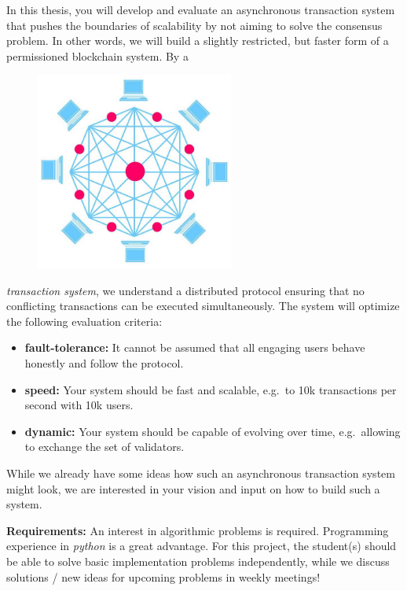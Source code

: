 \documentclass[a4paper,11pt]{article}
\begin{document}
\noindent In this thesis, you will develop and evaluate an asynchronous transaction system that pushes the boundaries of scalability by not aiming to solve the consensus problem. In other words, we will build a slightly restricted, but faster form of a permissioned blockchain system. By a
\begin{figure}
    \vspace{-0.5cm}
    \includegraphics[width=6.5cm]{network.jpeg}
    \vspace{-1.5cm}
\end{figure}
\emph{transaction system}, we understand a distributed protocol ensuring that no conflicting transactions can be executed simultaneously. The system will optimize the following evaluation criteria:
\begin{itemize}
    \item \textbf{fault-tolerance:} It cannot be assumed that all engaging users behave honestly and follow the protocol.
    \item \textbf{speed:} Your system should be fast and scalable, e.g.\ to 10k transactions per second with 10k users.
    \item \textbf{dynamic:} Your system should be capable of evolving over time, e.g.\ allowing to exchange the set of validators.
\end{itemize}
While we already have some ideas how such an asynchronous transaction system might look, we are interested in your vision and input on how to build such a system.

\bigskip


\noindent \textbf{Requirements:}
An interest in algorithmic problems is required. Programming experience in \emph{python} is a great advantage. For this project, the student(s) should be able to solve basic implementation problems independently, while we discuss solutions / new ideas for upcoming problems in weekly meetings!
\bigskip
\end{document}
